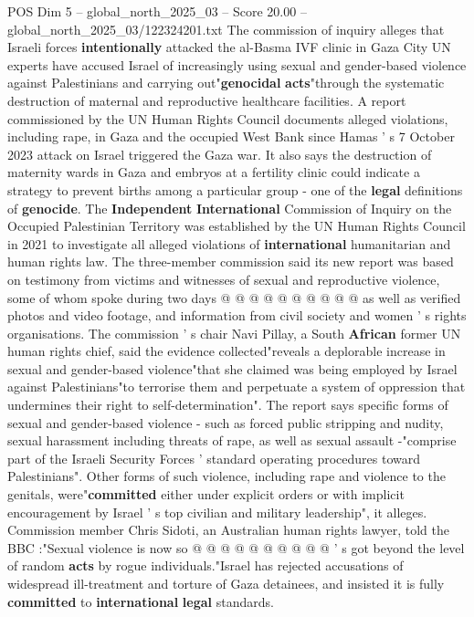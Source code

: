 \begin{textsample}{POS Dim 5 – global\_north\_2025\_03 – Score 20.00 – global\_north\_2025\_03/122324201.txt}  \label{ex:f5_pos_153}
The commission of inquiry alleges that Israeli forces \textbf{intentionally} attacked the al-Basma IVF clinic in Gaza City UN experts have accused Israel of increasingly using sexual and gender-based violence against Palestinians and carrying out"\textbf{genocidal} \textbf{acts}"through the systematic destruction of maternal and reproductive healthcare facilities.
A report commissioned by the UN Human Rights Council documents alleged violations, including rape, in Gaza and the occupied West Bank since Hamas ' s 7 October 2023 attack on Israel triggered the Gaza war.
It also says the destruction of maternity wards in Gaza and embryos at a fertility clinic could indicate a strategy to prevent births among a particular group - one of the \textbf{legal} definitions of \textbf{genocide}.
The \textbf{Independent} \textbf{International} Commission of Inquiry on the Occupied Palestinian Territory was established by the UN Human Rights Council in 2021 to investigate all alleged violations of \textbf{international} humanitarian and human rights law.
The three-member commission said its new report was based on testimony from victims and witnesses of sexual and reproductive violence, some of whom spoke during two days @ @ @ @ @ @ @ @ @ @ as well as verified photos and video footage, and information from civil society and women ' s rights organisations.
The commission ' s chair Navi Pillay, a South \textbf{African} former UN human rights chief, said the evidence collected"reveals a deplorable increase in sexual and gender-based violence"that she claimed was being employed by Israel against Palestinians"to terrorise them and perpetuate a system of oppression that undermines their right to self-determination".
The report says specific forms of sexual and gender-based violence - such as forced public stripping and nudity, sexual harassment including threats of rape, as well as sexual assault -"comprise part of the Israeli Security Forces ' standard operating procedures toward Palestinians".
Other forms of such violence, including rape and violence to the genitals, were"\textbf{committed} either under explicit orders or with implicit encouragement by Israel ' s top civilian and military leadership", it alleges.
Commission member Chris Sidoti, an Australian human rights lawyer, told the BBC :"Sexual violence is now so @ @ @ @ @ @ @ @ @ @ ' s got beyond the level of random \textbf{acts} by rogue individuals."Israel has rejected accusations of widespread ill-treatment and torture of Gaza detainees, and insisted it is fully \textbf{committed} to \textbf{international} \textbf{legal} standards.

\end{textsample}
